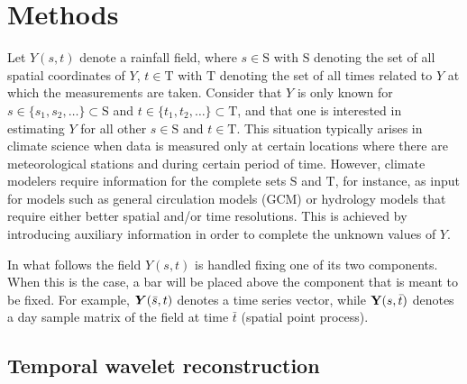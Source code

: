 {%
\section{Methods}\label{sec:3}

Let $Y(s,t)$ denote a  rainfall field, where  $s\in\mbox{S}$ with $\mbox{S}$ denoting the set of all spatial coordinates of $Y$, $t\in\mbox{T}$ with $\mbox{T}$ denoting the set of all times related to $Y$ at which the measurements are taken. Consider that $Y$ is only known for $s\in\{s_1,s_2,\dots\}\subset\mbox{S}$ and $t\in\{t_1,t_2,\dots\}\subset\mbox{T}$, and that one is interested in  estimating $Y$ for all other $s\in\mbox{S}$ and  $t\in\mbox{T}$. This situation typically arises in climate science when data is measured only at certain locations where there are meteorological stations and during certain period of time. However, climate modelers require information for the complete sets $\mbox{S}$ and $\mbox{T}$, for instance, as input for models such as general circulation models (GCM) or hydrology  models that require either better spatial and/or time resolutions.  This is achieved by introducing auxiliary information in order to complete the unknown values of $Y$. 

In what follows the field $Y(s,t)$ is handled fixing one of its two components. When this is the case, a bar will be placed above the component that is meant to be fixed. For example, $\text{\boldmath$Y$}(\bar{s},t)$ denotes a time series vector, while $\mbox{\textbf{Y}}(s,\bar{t})$  denotes a day sample matrix of the field at time $\bar{t}$ (spatial point process). 

\subsection{Temporal wavelet reconstruction} \label{subsubsec:3_1}

}
